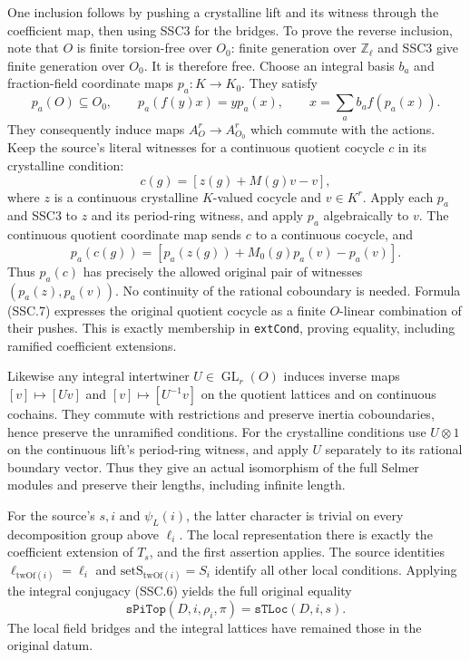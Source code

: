 One inclusion follows by pushing a crystalline lift and its witness
through the coefficient map, then using SSC3 for the bridges.
To prove the reverse inclusion, note that $O$ is finite
torsion-free over $O_0$: finite generation over $\mathbb Z_\ell$
and SSC3 give finite generation over $O_0$. It is therefore free.
Choose an integral basis $b_a$ and fraction-field coordinate maps
$p_a:K\to K_0$. They satisfy
\[
 p_a(O)\subseteq O_0,\qquad
 p_a(f(y)x)=y p_a(x),\qquad x=\sum_a b_a f(p_a(x)).              \tag{SSC.7}
\]
They consequently induce maps $A_O^r\to A_{O_0}^r$ which
commute with the actions. Keep the source's literal witnesses for a
continuous quotient cocycle $c$ in its crystalline condition:
\[
 c(g)=[z(g)+M(g)v-v],
\]
where $z$ is a continuous crystalline $K$-valued cocycle and
$v\in K^r$. Apply each $p_a$ and SSC3 to $z$ and its period-ring
witness, and apply $p_a$ algebraically to $v$. The continuous
quotient coordinate map sends $c$ to a continuous cocycle, and
\[
 p_a(c(g))=[p_a(z(g))+M_0(g)p_a(v)-p_a(v)].
\]
Thus $p_a(c)$ has precisely the allowed original pair of witnesses
$(p_a(z),p_a(v))$. No continuity of the rational coboundary is
needed. Formula (SSC.7)
expresses the original quotient cocycle as a finite $O$-linear
combination of their pushes. This is exactly membership in
\texttt{extCond}, proving equality, including ramified coefficient
extensions.

Likewise any integral intertwiner $U\in\operatorname{GL}_r(O)$
induces inverse maps $[v]\mapsto[Uv]$ and $[v]\mapsto[U^{-1}v]$
on the quotient lattices and on continuous cochains. They commute
with restrictions and preserve inertia coboundaries, hence preserve
the unramified conditions. For the crystalline conditions use
$U\otimes1$ on the continuous lift's period-ring witness, and
apply $U$ separately to its rational boundary vector. Thus they give an actual
isomorphism of the full Selmer modules and preserve their lengths,
including infinite length.

For the source's $s,i$ and $\psi_L(i)$, the latter character is
trivial on every decomposition group above $\ell_i$. The local
representation there is exactly the coefficient extension of
$T_s$, and the first assertion applies. The source identities
$\ell_{\mathrm{twOf}(i)}=\ell_i$ and
$\mathrm{setS}_{\mathrm{twOf}(i)}=S_i$ identify all other local
conditions. Applying the integral conjugacy (SSC.6) yields the
full original equality
\[
        \texttt{sPiTop}(D,i,\rho_i,\pi)
             =\texttt{sTLoc}(D,i,s).                          \tag{SSC.8}
\]
The local field bridges and the integral lattices have remained
those in the original datum.

